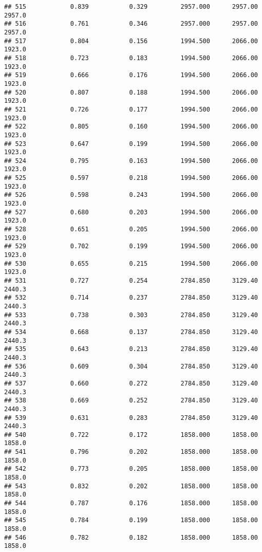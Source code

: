 \documentclass[
]{article}
\begin{document}
\begin{verbatim}
## 515            0.839           0.329         2957.000      2957.00       2957.0
## 516            0.761           0.346         2957.000      2957.00       2957.0
## 517            0.804           0.156         1994.500      2066.00       1923.0
## 518            0.723           0.183         1994.500      2066.00       1923.0
## 519            0.666           0.176         1994.500      2066.00       1923.0
## 520            0.807           0.188         1994.500      2066.00       1923.0
## 521            0.726           0.177         1994.500      2066.00       1923.0
## 522            0.805           0.160         1994.500      2066.00       1923.0
## 523            0.647           0.199         1994.500      2066.00       1923.0
## 524            0.795           0.163         1994.500      2066.00       1923.0
## 525            0.597           0.218         1994.500      2066.00       1923.0
## 526            0.598           0.243         1994.500      2066.00       1923.0
## 527            0.680           0.203         1994.500      2066.00       1923.0
## 528            0.651           0.205         1994.500      2066.00       1923.0
## 529            0.702           0.199         1994.500      2066.00       1923.0
## 530            0.655           0.215         1994.500      2066.00       1923.0
## 531            0.727           0.254         2784.850      3129.40       2440.3
## 532            0.714           0.237         2784.850      3129.40       2440.3
## 533            0.738           0.303         2784.850      3129.40       2440.3
## 534            0.668           0.137         2784.850      3129.40       2440.3
## 535            0.643           0.213         2784.850      3129.40       2440.3
## 536            0.609           0.304         2784.850      3129.40       2440.3
## 537            0.660           0.272         2784.850      3129.40       2440.3
## 538            0.669           0.252         2784.850      3129.40       2440.3
## 539            0.631           0.283         2784.850      3129.40       2440.3
## 540            0.722           0.172         1858.000      1858.00       1858.0
## 541            0.796           0.202         1858.000      1858.00       1858.0
## 542            0.773           0.205         1858.000      1858.00       1858.0
## 543            0.832           0.202         1858.000      1858.00       1858.0
## 544            0.787           0.176         1858.000      1858.00       1858.0
## 545            0.784           0.199         1858.000      1858.00       1858.0
## 546            0.782           0.182         1858.000      1858.00       1858.0

\end{verbatim}
\end{document}
